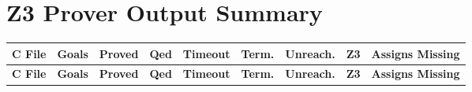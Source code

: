 \documentclass{article}
\begin{document}
\section*{Z3 Prover Output Summary}

\scriptsize
\begin{longtable}{p{3.5cm} >{\centering\arraybackslash}p{0.8cm} >{\centering\arraybackslash}p{1.3cm} >{\centering\arraybackslash}p{0.7cm} >{\centering\arraybackslash}p{0.9cm} >{\centering\arraybackslash}p{0.9cm} >{\centering\arraybackslash}p{0.9cm} >{\centering\arraybackslash}p{1cm} >{\centering\arraybackslash}p{1.8cm}}
\toprule
\textbf{C File} & \textbf{Goals} & \textbf{Proved} & \textbf{Qed} & \textbf{Timeout} & \textbf{Term.} & \textbf{Unreach.} & \textbf{Z3} & \textbf{Assigns Missing} \\
\midrule
\endfirsthead

\toprule
\textbf{C File} & \textbf{Goals} & \textbf{Proved} & \textbf{Qed} & \textbf{Timeout} & \textbf{Term.} & \textbf{Unreach.} & \textbf{Z3} & \textbf{Assigns Missing} \\
\midrule
\endhead


\end{longtable}
\end{document}
